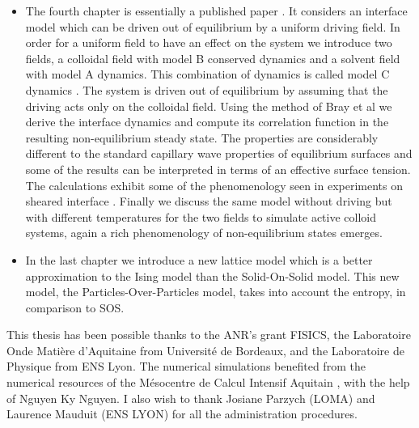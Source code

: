 \begin{itemize}
   
    \item The fourth chapter is essentially a published paper \cite{dean_effect_2020}. 
    It considers an interface model which can be driven out of equilibrium by a uniform driving field. In order for a uniform field to have an effect on the system we introduce two fields, a colloidal field with model B conserved dynamics and a solvent field with model A dynamics. This combination of dynamics is called model C dynamics \cite{hohenberg_theory_1977}. The system is driven out of equilibrium by assuming that the driving acts only on the colloidal field. Using the method of Bray et al \cite{bray_interface_2001} we derive the interface dynamics and compute its correlation function in the resulting non-equilibrium steady state. The properties are considerably different to the standard capillary wave properties of equilibrium surfaces and some of the results can be interpreted in terms of an effective surface tension. The calculations exhibit some of the phenomenology seen in experiments on sheared interface \cite{derks_suppression_2006}. Finally we discuss the same model without driving but with different temperatures for the two fields to simulate active colloid systems, again a rich phenomenology of non-equilibrium states emerges.
    \item In the last chapter we introduce a new lattice model which is a better approximation to the Ising model than the Solid-On-Solid model. This new model, the Particles-Over-Particles model, takes into account the entropy, in comparison to SOS.
\end{itemize}

This thesis has been possible thanks to the ANR's grant FISICS, the Laboratoire Onde Matière d'Aquitaine from Université de Bordeaux, and the Laboratoire de Physique  from ENS Lyon. The numerical simulations benefited from the numerical resources of the Mésocentre de Calcul Intensif Aquitain \cite{noauthor_mesocentre_nodate}, with the help of Nguyen Ky Nguyen. I also wish to thank Josiane Parzych (LOMA) and Laurence Mauduit (ENS LYON) for all the administration procedures.
